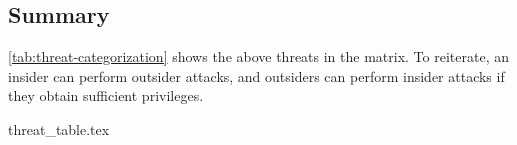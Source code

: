 \subsection{Summary}

\cref{tab:threat-categorization} shows the above threats in the matrix.
To reiterate, an insider can perform outsider attacks, and outsiders can perform insider attacks if they obtain sufficient privileges.

{threat_table.tex}


